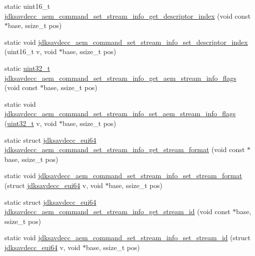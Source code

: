 \begin{DoxyCompactItemize}
\item 
static uint16\+\_\+t \hyperlink{group__command__set__stream__info_ga3307e1b78512000da0fd21eb6908fb74}{jdksavdecc\+\_\+aem\+\_\+command\+\_\+set\+\_\+stream\+\_\+info\+\_\+get\+\_\+descriptor\+\_\+index} (void const $\ast$base, ssize\+\_\+t pos)
\item 
static void \hyperlink{group__command__set__stream__info_ga5e3cb50545ae82c947a803613c5e688a}{jdksavdecc\+\_\+aem\+\_\+command\+\_\+set\+\_\+stream\+\_\+info\+\_\+set\+\_\+descriptor\+\_\+index} (uint16\+\_\+t v, void $\ast$base, ssize\+\_\+t pos)
\item 
static \hyperlink{parse_8c_a6eb1e68cc391dd753bc8ce896dbb8315}{uint32\+\_\+t} \hyperlink{group__command__set__stream__info_gaafad60a3f37453750953a51743793e8a}{jdksavdecc\+\_\+aem\+\_\+command\+\_\+set\+\_\+stream\+\_\+info\+\_\+get\+\_\+aem\+\_\+stream\+\_\+info\+\_\+flags} (void const $\ast$base, ssize\+\_\+t pos)
\item 
static void \hyperlink{group__command__set__stream__info_ga0fc97d4aa9529b7aaf07d6f5d4a4792a}{jdksavdecc\+\_\+aem\+\_\+command\+\_\+set\+\_\+stream\+\_\+info\+\_\+set\+\_\+aem\+\_\+stream\+\_\+info\+\_\+flags} (\hyperlink{parse_8c_a6eb1e68cc391dd753bc8ce896dbb8315}{uint32\+\_\+t} v, void $\ast$base, ssize\+\_\+t pos)
\item 
static struct \hyperlink{structjdksavdecc__eui64}{jdksavdecc\+\_\+eui64} \hyperlink{group__command__set__stream__info_ga63a8f056b16ac001813c2d5092735558}{jdksavdecc\+\_\+aem\+\_\+command\+\_\+set\+\_\+stream\+\_\+info\+\_\+get\+\_\+stream\+\_\+format} (void const $\ast$base, ssize\+\_\+t pos)
\item 
static void \hyperlink{group__command__set__stream__info_ga4a70a7a66d1a6cf75e5e924fdbc9cd0a}{jdksavdecc\+\_\+aem\+\_\+command\+\_\+set\+\_\+stream\+\_\+info\+\_\+set\+\_\+stream\+\_\+format} (struct \hyperlink{structjdksavdecc__eui64}{jdksavdecc\+\_\+eui64} v, void $\ast$base, ssize\+\_\+t pos)
\item 
static struct \hyperlink{structjdksavdecc__eui64}{jdksavdecc\+\_\+eui64} \hyperlink{group__command__set__stream__info_ga896defcaa5ee7d104a5951d0ea18a674}{jdksavdecc\+\_\+aem\+\_\+command\+\_\+set\+\_\+stream\+\_\+info\+\_\+get\+\_\+stream\+\_\+id} (void const $\ast$base, ssize\+\_\+t pos)
\item 
static void \hyperlink{group__command__set__stream__info_ga794a25f95ebd09621ac0438ca4b06a5c}{jdksavdecc\+\_\+aem\+\_\+command\+\_\+set\+\_\+stream\+\_\+info\+\_\+set\+\_\+stream\+\_\+id} (struct \hyperlink{structjdksavdecc__eui64}{jdksavdecc\+\_\+eui64} v, void $\ast$base, ssize\+\_\+t pos)

\end{DoxyCompactItemize}
